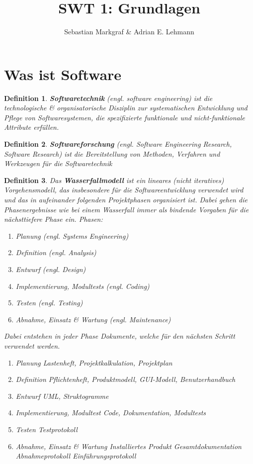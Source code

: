 \documentclass[a4paper]{article}
\title{SWT 1: Grundlagen}
\author{Sebastian Markgraf \& Adrian E. Lehmann}
\theoremstyle{break}
\newtheorem{defi}{Definition}[section]
\begin{document}
\maketitle
\section {Was ist Software}
\begin {defi}
  \textbf{Softwaretechnik} (engl. software engineering) ist die technologische \& organisatorische Disziplin zur systematischen Entwicklung und Pflege von Softwaresystemen, die spezifizierte funktionale und nicht-funktionale Attribute erfüllen.
\end {defi}

\begin {defi}
  \textbf{Softwareforschung} (engl. Software Engineering Research, Software Research) ist die Bereitstellung von Methoden, Verfahren und Werkzeugen für die Softwaretechnik
\end {defi}


\begin {defi}
  Das \textbf{Wasserfallmodell} ist ein lineares (nicht iteratives) Vorgehensmodell, das insbesondere für die Softwareentwicklung verwendet wird und das in aufeinander folgenden Projektphasen organisiert ist. Dabei gehen die Phasenergebnisse wie bei einem Wasserfall immer als bindende Vorgaben für die nächsttiefere Phase ein.
  Phasen:
  \begin {enumerate}
  \item Planung (\textit{engl. Systems Engineering})
  \item Definition (\textit{engl. Analysis})
  \item Entwurf (\textit{engl. Design})
  \item Implementierung, Modultests (\textit{engl. Coding})
  \item Testen (\textit{engl. Testing})
  \item Abnahme, Einsatz \& Wartung (\textit{engl. Maintenance})
  \end {enumerate}
  Dabei entstehen in jeder Phase Dokumente, welche für den nächsten Schritt verwendet werden.
  \begin {enumerate}
  \item Planung
	  \subitem Lastenheft, Projektkalkulation, Projektplan
  \item Definition
	  \subitem Pflichtenheft, Produktmodell, GUI-Modell, Benutzerhandbuch
  \item Entwurf
	  \subitem UML, Struktogramme
  \item Implementierung, Modultest
	  \subitem Code, Dokumentation, Modultests
  \item Testen
	  \subitem Testprotokoll
  \item Abnahme, Einsatz \& Wartung
	  \subitem Installiertes Produkt
	  \subitem Gesamtdokumentation
	  \subitem Abnahmeprotokoll
      \subitem Einführungsprotokoll
    \end {enumerate}
\end {defi}
\end{document}
